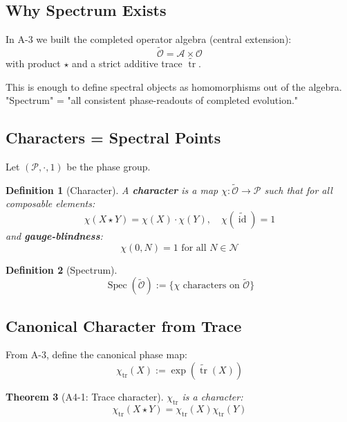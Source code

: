 \documentclass[12pt, oneside]{article}
\newtheorem{theorem}{Theorem}[section]
\newtheorem{definition}[theorem]{Definition}
\DeclareMathOperator{\id}{id}
\DeclareMathOperator{\tr}{tr}
\DeclareMathOperator{\Spec}{Spec}
\newcommand{\N}{\mathcal{N}}
\newcommand{\A}{\mathcal{A}}
\newcommand{\Opr}{\mathcal{O}}
\newcommand{\wtilde}{\widetilde}
\begin{document}
\subsection{Why Spectrum Exists}

In A-3 we built the completed operator algebra (central extension):
\begin{equation}
\wtilde{\Opr} = \A \times \Opr
\end{equation}
with product $\star$ and a strict additive trace $\wtilde{\tr}$.

This is enough to define spectral objects as homomorphisms out of the algebra. "Spectrum" = "all consistent phase-readouts of completed evolution."

\subsection{Characters = Spectral Points}

Let $(\mathcal{P}, \cdot, 1)$ be the phase group.

\begin{definition}[Character]
A \textbf{character} is a map $\chi: \wtilde{\Opr} \rightarrow \mathcal{P}$ such that for all composable elements:
\begin{equation}
\chi(X \star Y) = \chi(X) \cdot \chi(Y),\quad \chi(\wtilde{\id}) = 1
\end{equation}
and \textbf{gauge-blindness}:
\begin{equation}
\chi(0, N) = 1 \text{ for all } N \in \N
\end{equation}
\end{definition}

\begin{definition}[Spectrum]
\begin{equation}
\Spec(\wtilde{\Opr}) := \{ \chi \text{ characters on } \wtilde{\Opr} \}
\end{equation}
\end{definition}

\subsection{Canonical Character from Trace}

From A-3, define the canonical phase map:
\begin{equation}
\chi_{\tr}(X) := \exp(\wtilde{\tr}(X))
\end{equation}

\begin{theorem}[A4-1: Trace character]
$\chi_{\tr}$ is a character:
\begin{equation}
\chi_{\tr}(X \star Y) = \chi_{\tr}(X) \chi_{\tr}(Y)
\end{equation}
\end{theorem}
\end{document}
